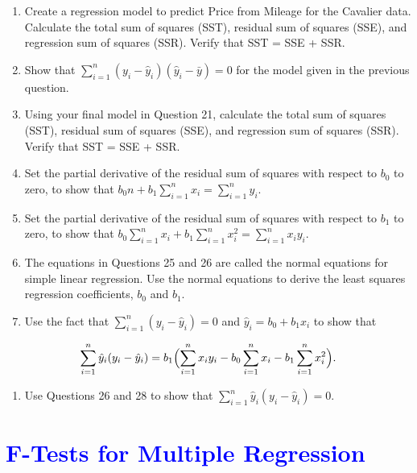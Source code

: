 \documentclass[
]{report}
\providecommand{\tightlist}{%
  \setlength{\itemsep}{0pt}\setlength{\parskip}{0pt}}
\begin{document}
\begin{enumerate}
\def\labelenumi{\arabic{enumi}.}
\setcounter{enumi}{21}
\item
  Create a regression model to predict Price from Mileage for the Cavalier data. Calculate the total sum of squares (SST), residual sum of squares (SSE), and regression sum of squares (SSR). Verify that SST = SSE + SSR.
\item
  Show that \(\scriptstyle \sum_{i=1}^n (y_i - \hat{y}_i)(\hat{y}_i - \bar{y}) = 0\) for the model given in the previous question.
\item
  Using your final model in Question 21, calculate the total sum of squares (SST), residual sum of squares (SSE), and regression sum of squares (SSR). Verify that SST = SSE + SSR.
\item
  Set the partial derivative of the residual sum of squares with respect to \(\scriptstyle b_0\) to zero, to show that \(\scriptstyle b_0 n + b_1 \sum_{i=1}^n x_i = \sum_{i=1}^n y_i.\)
\item
  Set the partial derivative of the residual sum of squares with respect to \(\scriptstyle b_1\) to zero, to show that \(\scriptstyle b_0 \sum_{i=1}^n x_i + b_1 \sum_{i=1}^n x_i^2 = \sum_{i=1}^n x_i y_i.\)
\item
  The equations in Questions 25 and 26 are called the normal equations for simple linear regression. Use the normal equations to derive the least squares regression coefficients, \(\scriptstyle b_0\) and \(\scriptstyle b_1\).
\item
  Use the fact that \(\scriptstyle \sum_{i=1}^n (y_i - \hat{y}_i) = 0\) and \(\scriptstyle \hat{y}_i = b_0 + b_1 x_i\) to show that
\end{enumerate}

\begin{equation}
\sum_{i=1}^n \hat{y}_i (y_i - \hat{y}_i)
  = b_1 \Bigl(\sum_{i=1}^n x_i y_i - b_0 \sum_{i=1}^n x_i - b_1 \sum_{i=1}^n x_i^2\Bigr).
  \notag
\end{equation}

\begin{enumerate}
\def\labelenumi{\arabic{enumi}.}
\setcounter{enumi}{28}
\tightlist
\item
  Use Questions 26 and 28 to show that \(\scriptstyle \sum_{i=1}^n \hat{y}_i (y_i - \hat{y}_i) = 0.\)
\end{enumerate}

\hypertarget{section-34}{%
\section{\texorpdfstring{\textcolor{blue}{F-Tests for Multiple Regression}}{}}\label{section-34}}
\end{document}
